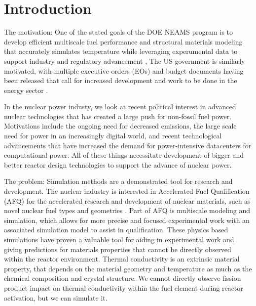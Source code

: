 \setlength{\parindent}{0.5in}

\chapter{Introduction}

The motivation: One of the stated goals of the DOE NEAMS program is to develop efficient multiscale fuel performance and structural materials modeling that accurately simulates temperature while leveraging experumental data to support industry and regulatory advancement \autocite{TechnicalAreas}, The US government is similarly motivated, with multiple executive orders (EOs) and budget documents having been released that call for increased development and work to be done in the energy sector \autocite{ordersDeployingAdvancedNuclear2025}. 

In the nuclear power industy, we look at recent political interest in advanced nuclear technologies that has created a large push for non-fossil fuel power. Motivations include the ongoing need for decreased emissions, the large scale need for power in an increasingly digital world, and recent technological advancements that have increased the demand for power-intensive datacenters for computational power. All of these things necessitate development of bigger and better reactor design technologies to support the advance of nuclear power.

The problem: Simulation methods are a demonstrated tool for research and development. The nuclear industry is interested in Accelerated Fuel Qualification (AFQ) for the accelerated research and development of nuclear materials, such as novel nuclear fuel types and geometries \autocite{ordersDeployingAdvancedNuclear2025,matthewsMechanisticMultiscaleUncertainty2026,choiAcceleratedFuelQualification2026}. Part of AFQ is multiscale modeling and simulation, which allows for more precise and focused experimental work with an associated simulation model to assist in qualification. These physics based simulations have proven a valuable tool for aiding in experimental work and giving predictions for materials properties that cannot be directly observed within the reactor environment. Thermal conductivity is an extrinsic material property, that depends on the material geometry and temperature as much as the chemical composition and crystal structure. We cannot directly observe fission product impact on thermal conductivity within the fuel element during reactor activation, but we can simulate it. 

